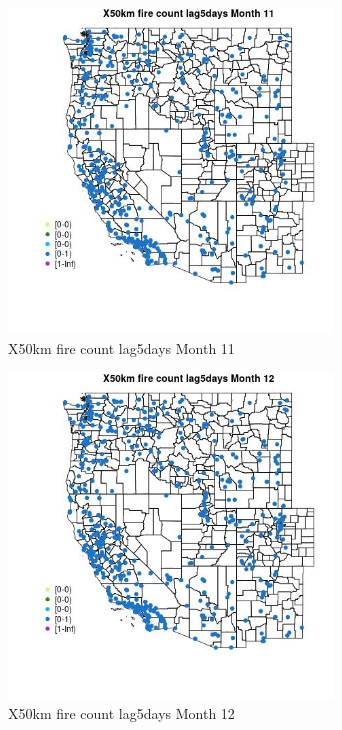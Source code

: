 \begin{figure} 
\centering  
\includegraphics[width=0.77\textwidth]{Code_Outputs/Report_ML_input_PM25_Step4_part_e_de_duplicated_aves_compiled_2019-05-14wNAs_MapObsMo11X50km_fire_count_lag5days.jpg} 
\caption{\label{fig:Report_ML_input_PM25_Step4_part_e_de_duplicated_aves_compiled_2019-05-14wNAsMapObsMo11X50km_fire_count_lag5days}X50km fire count lag5days Month 11} 
\end{figure} 
 

\begin{figure} 
\centering  
\includegraphics[width=0.77\textwidth]{Code_Outputs/Report_ML_input_PM25_Step4_part_e_de_duplicated_aves_compiled_2019-05-14wNAs_MapObsMo12X50km_fire_count_lag5days.jpg} 
\caption{\label{fig:Report_ML_input_PM25_Step4_part_e_de_duplicated_aves_compiled_2019-05-14wNAsMapObsMo12X50km_fire_count_lag5days}X50km fire count lag5days Month 12} 
\end{figure} 
 

